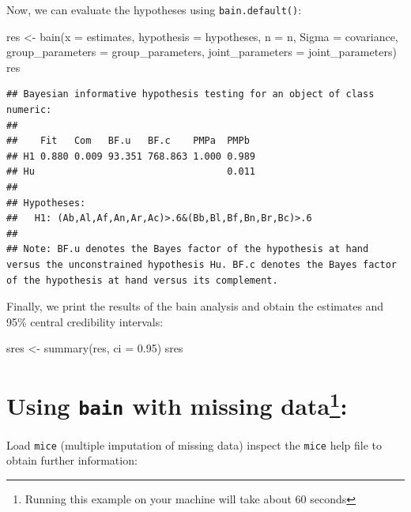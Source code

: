 \documentclass[
]{book}
\newenvironment{Shaded}{\begin{snugshade}}{\end{snugshade}}
\newcommand{\AttributeTok}[1]{\textcolor[rgb]{0.77,0.63,0.00}{#1}}
\newcommand{\FloatTok}[1]{\textcolor[rgb]{0.00,0.00,0.81}{#1}}
\newcommand{\FunctionTok}[1]{\textcolor[rgb]{0.00,0.00,0.00}{#1}}
\newcommand{\NormalTok}[1]{#1}
\newcommand{\OtherTok}[1]{\textcolor[rgb]{0.56,0.35,0.01}{#1}}
\begin{document}
Now, we can evaluate the hypotheses using \texttt{bain.default()}:

\begin{Shaded}
\begin{Highlighting}[]
\NormalTok{res }\OtherTok{\textless{}{-}} \FunctionTok{bain}\NormalTok{(}\AttributeTok{x =}\NormalTok{ estimates,}
            \AttributeTok{hypothesis =}\NormalTok{ hypotheses,}
            \AttributeTok{n =}\NormalTok{ n,}
            \AttributeTok{Sigma =}\NormalTok{ covariance,}
            \AttributeTok{group\_parameters =}\NormalTok{ group\_parameters,}
            \AttributeTok{joint\_parameters =}\NormalTok{ joint\_parameters)}
\NormalTok{res}
\end{Highlighting}
\end{Shaded}

\begin{verbatim}
## Bayesian informative hypothesis testing for an object of class numeric:
## 
##    Fit   Com   BF.u   BF.c    PMPa  PMPb 
## H1 0.880 0.009 93.351 768.863 1.000 0.989
## Hu                                  0.011
## 
## Hypotheses:
##   H1: (Ab,Al,Af,An,Ar,Ac)>.6&(Bb,Bl,Bf,Bn,Br,Bc)>.6
## 
## Note: BF.u denotes the Bayes factor of the hypothesis at hand versus the unconstrained hypothesis Hu. BF.c denotes the Bayes factor of the hypothesis at hand versus its complement.
\end{verbatim}

Finally, we print the results of the bain analysis and obtain the estimates and 95\%
central credibility intervals:

\begin{Shaded}
\begin{Highlighting}[]
\NormalTok{sres }\OtherTok{\textless{}{-}} \FunctionTok{summary}\NormalTok{(res, }\AttributeTok{ci =} \FloatTok{0.95}\NormalTok{)}
\NormalTok{sres}
\end{Highlighting}
\end{Shaded}

\hypertarget{using-bain-with-missing-data}{%
\section[Using \texttt{bain} with missing data:]{\texorpdfstring{Using \texttt{bain} with missing data\footnote{Running this example on your machine will take about 60 seconds}:}{Using bain with missing data:}}\label{using-bain-with-missing-data}}

Load \texttt{mice} (multiple imputation of missing data) inspect the \texttt{mice} help file to obtain further information:
\end{document}

